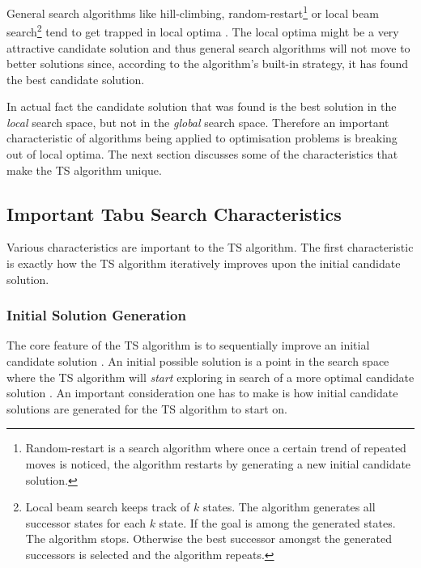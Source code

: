 General search algorithms like hill-climbing, random-restart\footnote{Random-restart is a search algorithm where once a certain trend of repeated moves is noticed, the algorithm restarts by generating a new initial candidate solution\cite{AIModernApproach}.} or local beam search\footnote{Local beam search keeps track of $k$ states. The algorithm generates all successor states for each $k$ state. If the goal is among the generated states. The algorithm stops. Otherwise the best successor amongst the generated successors is selected and the algorithm repeats\cite{AIModernApproach}.} tend to get trapped in local optima \cite{AIModernApproach}. The local optima might be a very attractive candidate solution and thus general search algorithms will not move to better solutions since, according to the algorithm's built-in strategy, it has found the best candidate solution. 

In actual fact the candidate solution that was found is the best solution in the \emph{local} search space, but not in the \emph{global} search space\cite{CompuIntelligenceIntro,AIModernApproach}. Therefore an important characteristic of algorithms being applied to optimisation problems is breaking out of local optima\cite{CompuIntelligenceIntro,AIModernApproach}.
The next section discusses some of the characteristics that make the \gls{TS} algorithm unique.

\subsection{Important Tabu Search Characteristics}
\label{sec:TScharacteristics}
Various characteristics are important to the \gls{TS} algorithm. The first characteristic is exactly how the \gls{TS} algorithm iteratively improves upon the initial candidate solution.

\subsubsection{Initial Solution Generation}
The core feature of the \gls{TS} algorithm is to sequentially improve an initial candidate solution \cite{TSHazardous}. An initial possible solution is a point in the search space where the \gls{TS} algorithm will \emph{start} exploring in search of a more optimal candidate solution \cite{AIModernApproach,TSHazardous}.
An important consideration one has to make is how initial candidate solutions are generated for the \gls{TS} algorithm to start on\cite{AIModernApproach,TSHazardous}.


